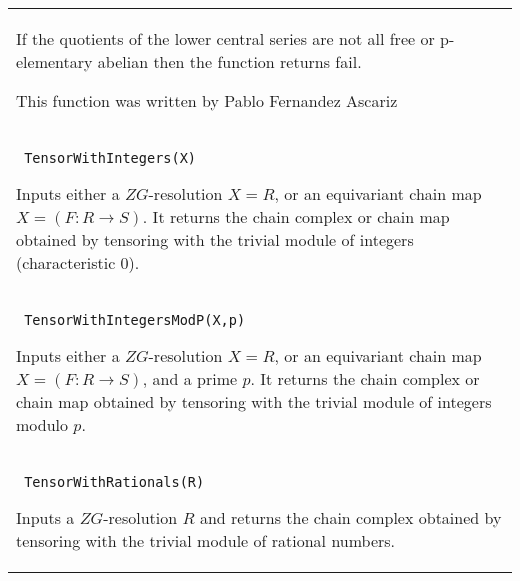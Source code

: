 \documentclass[a4paper,11pt]{report}
\begin{document}
{\begin{center}
\begin{tabular}{|l|}
 If the quotients of the lower central series are not all free or p-elementary
abelian then the function returns fail.

 This function was written by Pablo Fernandez Ascariz \\
 \index{TensorWithIntegers} \texttt{ TensorWithIntegers(X) } 

 Inputs either a $ZG$-resolution $X=R$, or an equivariant chain map $X = (F:R \longrightarrow S)$. It returns the chain complex or chain map obtained by tensoring with the
trivial module of integers (characteristic 0). \\
 \index{TensorWithIntegersModP} \texttt{ TensorWithIntegersModP(X,p) } 

 Inputs either a $ZG$-resolution $X=R$, or an equivariant chain map $X = (F:R \longrightarrow S)$, and a prime $p$. It returns the chain complex or chain map obtained by tensoring with the
trivial module of integers modulo $p$. \\
 \index{TensorWithRationals} \texttt{ TensorWithRationals(R) } 

 Inputs a $ZG$-resolution $R$ and returns the chain complex obtained by tensoring with the trivial module of
rational numbers. \\
\end{tabular}\\[2mm]
\end{center}

 }

 
\end{document}
